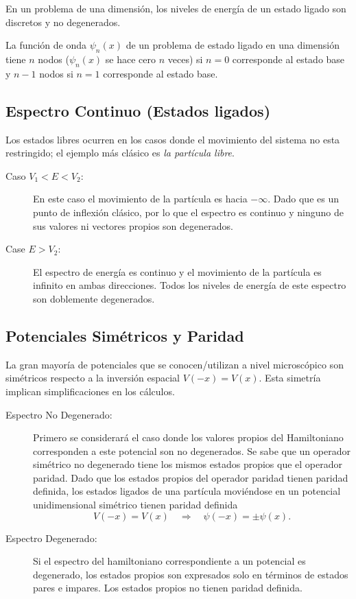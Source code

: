 \begin{teorema}
    En un problema de una dimensión, los niveles de energía de un estado ligado son discretos y no degenerados.
\end{teorema}


\begin{teorema}
    La función de onda $\psi _n (x)$ de un problema de estado ligado en una dimensión tiene $n$ nodos ($\psi _n (x)$ se hace cero $n$ veces) si $n=0$ corresponde  al estado base y $n-1$ nodos si $n=1$ corresponde al estado base.
\end{teorema}

\subsection{Espectro Continuo (Estados ligados)}

Los estados libres ocurren en los casos donde el movimiento del sistema no esta restringido; el ejemplo más clásico es \textit{la partícula libre}. 
\begin{description}
    \item[Caso $V_1 < E < V_2$: ] En este caso el movimiento de la partícula es hacia $-\infty$. Dado que es un punto de inflexión clásico, por lo que el espectro es continuo y ninguno de sus valores ni vectores propios son degenerados.
    \item[Case $E > V_2$: ] El espectro de energía es continuo y el movimiento de la partícula es infinito en ambas direcciones. Todos los niveles de energía de este espectro son doblemente degenerados.
\end{description}

\subsection{Potenciales Simétricos y Paridad}

La gran mayoría de potenciales que se conocen/utilizan a nivel microscópico son simétricos respecto a la inversión espacial $V(-x) = V(x)$. Esta simetría implican simplificaciones en los cálculos. 

\begin{description}
    \item[Espectro No Degenerado: ] Primero se considerará el caso donde los valores propios del Hamiltoniano corresponden a este potencial son no degenerados. Se sabe que un operador simétrico no degenerado tiene los mismos estados propios que el operador paridad. Dado que los estados propios del operador paridad tienen paridad definida, los estados ligados de una partícula moviéndose en un potencial unidimensional simétrico tienen paridad definida
        \begin{equation}
            V(-x) = V(x) \quad \Rightarrow \quad \psi (-x) = \pm \psi (x).
        \end{equation}
    \item[Espectro Degenerado: ] Si el espectro del hamiltoniano correspondiente a un potencial es degenerado, los estados propios son expresados solo en términos de estados pares e impares. Los estados propios no tienen paridad definida.
\end{description}

